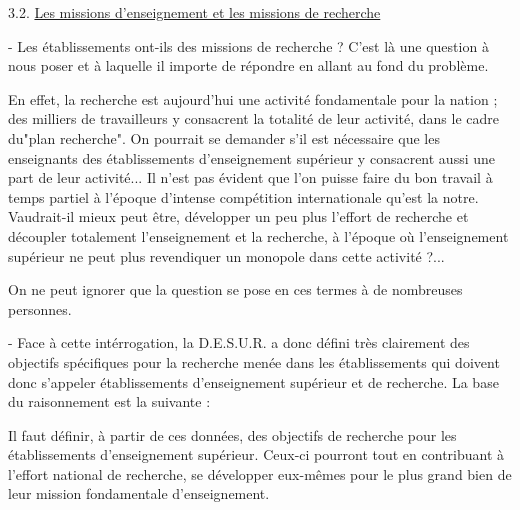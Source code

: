 
3.2. \uline{Les missions d'enseignement et les missions de recherche}

- Les établissements ont-ils des missions de recherche ? C'est là une question à nous poser et à laquelle il importe de répondre en allant au fond du problème.

En effet, la recherche est aujourd'hui une activité fondamentale pour la nation ; des milliers de travailleurs y consacrent la totalité de leur activité, dans le cadre du"plan recherche". On pourrait se demander s'il est nécessaire que les enseignants des établissements d'enseignement supérieur y consacrent aussi une part de leur activité... Il n'est pas évident que l'on puisse faire du bon travail à temps partiel à l'époque d'intense compétition internationale qu'est la notre. Vaudrait-il mieux peut être, développer un peu plus l'effort de recherche et découpler totalement l'enseignement et la recherche, à l'époque où l'enseignement supérieur ne peut plus revendiquer un monopole dans cette activité ?...

On ne peut ignorer que la question se pose en ces termes à de nombreuses personnes. \unsure{-}

- Face à cette intérrogation, la D.E.S.U.R. a donc défini très clairement des objectifs spécifiques pour la recherche menée dans les établissements qui doivent donc s'appeler établissements d'enseignement supérieur et de recherche. La base du raisonnement est la suivante :

\noindent{}

Il faut définir, à partir de ces données, des objectifs de recherche pour les établissements d'enseignement supérieur. Ceux-ci pourront tout en contribuant à l'effort national de recherche, se développer eux-mêmes pour le plus grand bien de leur mission fondamentale d'enseignement.
